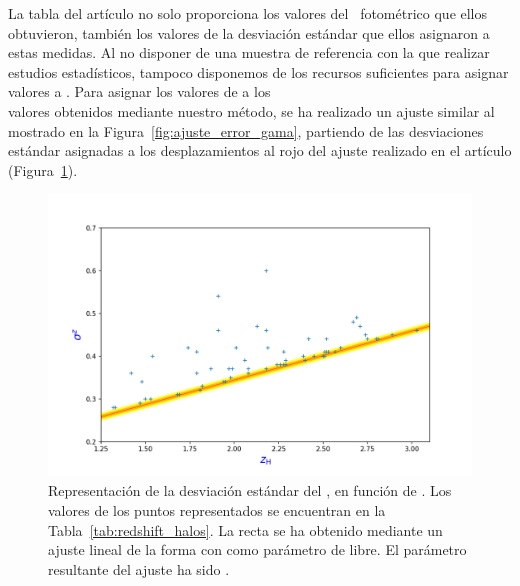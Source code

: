 La tabla del artículo no solo proporciona los valores del \rt\ fotométrico que ellos obtuvieron, también los valores de la desviación estándar que ellos asignaron a estas medidas. Al no disponer de una muestra de referencia con la que realizar estudios estadísticos, tampoco disponemos de los recursos suficientes para asignar valores a . Para asignar los valores de  a los \linebreak
\\
valores  obtenidos mediante nuestro método, se ha realizado un ajuste similar al mostrado en la Figura~\ref{fig:ajuste_error_gama}, partiendo de las desviaciones estándar asignadas a los desplazamientos al rojo del ajuste realizado en el artículo (Figura~\ref{fig:ajuste_errores_ajuste}).

\vspace*{-1mm}

\begin{figure}[h]
    \begin{center}
         \includegraphics[width=16cm]{3_Redshift_Hatlas/ajuste_errores.png}
    \end{center}
    \vspace*{-10mm}
    \caption{\small Representación de la desviación estándar del \rt,  en función de . Los valores de los puntos representados se encuentran en la Tabla~\ref{tab:redshift_halos}. La recta se ha obtenido mediante un ajuste lineal de la forma  con  como parámetro de libre. El parámetro resultante del ajuste ha sido .}
    \label{fig:ajuste_errores_ajuste}
\end{figure}


\vspace*{-1mm}


